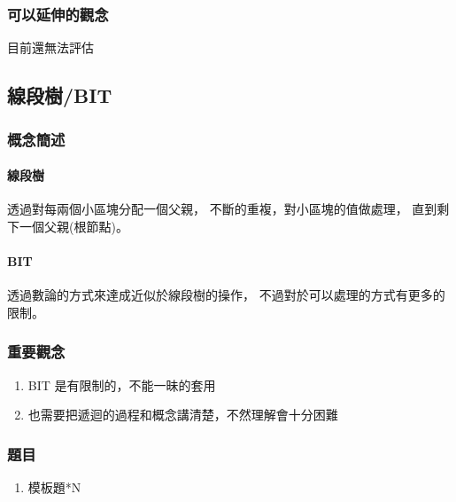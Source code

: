 \documentclass[12pt,oneside]{article}
\begin{document}
\subsubsection*{可以延伸的觀念}
目前還無法評估


\clearpage
\subsection{線段樹/BIT}
\subsubsection*{概念簡述}

\paragraph*{線段樹}
\begin{adjustwidth}{2em}{0em}
    透過對每兩個小區塊分配一個父親，
    不斷的重複，對小區塊的值做處理，
    直到剩下一個父親(根節點)。
\end{adjustwidth}

\paragraph*{BIT}
\begin{adjustwidth}{2em}{0em}
    透過數論的方式來達成近似於線段樹的操作，    
    不過對於可以處理的方式有更多的限制。
\end{adjustwidth}


\subsubsection*{重要觀念}
\begin{adjustwidth}{2em}{0em}
\begin{enumerate}
    \item  BIT 是有限制的，不能一昧的套用
    \item 也需要把遞迴的過程和概念講清楚，不然理解會十分困難
\end{enumerate}
\end{adjustwidth}

\subsubsection*{題目}
\begin{adjustwidth}{2em}{0em}
\begin{enumerate}
    \item 模板題*N
\end{enumerate}
\end{adjustwidth}
\end{document}
